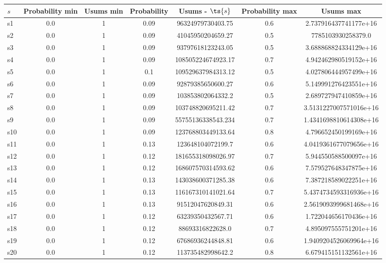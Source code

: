\documentclass{article}
\begin{document}
\noindent\begin{tabular}{|l|c|c|c|c|c|c|}
\hline
$s$& Probability min & Usums min & Probability & Usums - $\ts{s}$ & Probability max & Usums max\\
\hline
s1 &0.0 & 1 & 0.09 & 96324979730403.75 & 0.6 & 2.737916437741177e+16\\
\hline
s2 &0.0 & 1 & 0.09 & 41045950204659.27 & 0.5 & 7785103930258379.0\\
\hline
s3 &0.0 & 1 & 0.09 & 93797618123243.05 & 0.5 & 3.688868824334129e+16\\
\hline
s4 &0.0 & 1 & 0.09 & 108505224674923.17 & 0.7 & 4.942462980519152e+16\\
\hline
s5 &0.0 & 1 & 0.1 & 109529637984313.12 & 0.5 & 4.027806444957499e+16\\
\hline
s6 &0.0 & 1 & 0.09 & 92879385650600.27 & 0.6 & 5.149991276423551e+16\\
\hline
s7 &0.0 & 1 & 0.09 & 103853802064332.2 & 0.5 & 2.689727947410859e+16\\
\hline
s8 &0.0 & 1 & 0.09 & 103748820695211.42 & 0.7 & 3.5131227007571016e+16\\
\hline
s9 &0.0 & 1 & 0.09 & 55755136338543.234 & 0.7 & 1.4341698810614308e+16\\
\hline
s10 &0.0 & 1 & 0.09 & 123768803449133.64 & 0.8 & 4.796652450199169e+16\\
\hline
s11 &0.0 & 1 & 0.13 & 123648104072199.7 & 0.6 & 4.0419361677079656e+16\\
\hline
s12 &0.0 & 1 & 0.12 & 181655318098026.97 & 0.7 & 5.944550588500097e+16\\
\hline
s13 &0.0 & 1 & 0.12 & 168607570314593.62 & 0.6 & 7.579527648347875e+16\\
\hline
s14 &0.0 & 1 & 0.13 & 143038600371285.38 & 0.6 & 7.387218589022251e+16\\
\hline
s15 &0.0 & 1 & 0.13 & 116167310141021.64 & 0.7 & 5.4374734593316936e+16\\
\hline
s16 &0.0 & 1 & 0.13 & 91512047620849.31 & 0.6 & 2.5619093999681468e+16\\
\hline
s17 &0.0 & 1 & 0.12 & 63239350432567.71 & 0.6 & 1.722044656170436e+16\\
\hline
s18 &0.0 & 1 & 0.12 & 88693316822628.0 & 0.7 & 4.895097555751201e+16\\
\hline
s19 &0.0 & 1 & 0.12 & 67686936244848.81 & 0.6 & 1.9409204526069964e+16\\
\hline
s20 &0.0 & 1 & 0.12 & 113735482998642.2 & 0.8 & 6.679415151132561e+16\\

\end{tabular}
\end{document}
